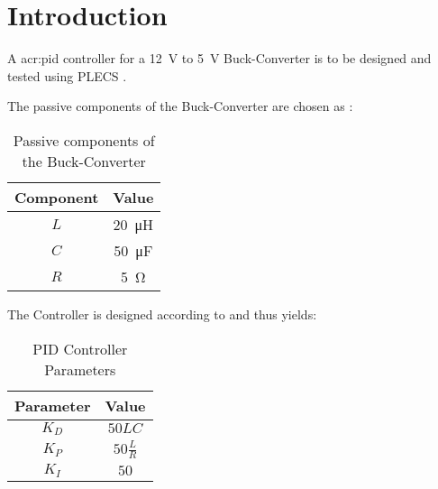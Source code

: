 \chapter{Introduction}
\label{chapter:introduction}

A \gls{acr:pid} controller for a \qty{12}{\volt} to \qty{5}{\volt} Buck-Converter is to be designed and tested using PLECS \autocite{PLECSPlexim}.

The passive components of the Buck-Converter are chosen as :

\begin{table}[htbp]
    \centering
    \begin{tabular}{c|c}
        Component & Value \\ \hline
        $L$ & \qty{20}{\micro\henry} \\ 
        $C$ & \qty{50}{\micro\farad} \\ 
        $R$ & \qty{5}{\ohm} \\ 
    \end{tabular}
    \caption{Passive components of the Buck-Converter}
    \label{tab:components}
\end{table}

The Controller is designed according to \autocite{samosirSimpleFormulaDesigning2023} and thus yields:

\begin{table}[htbp]
    \centering
    \begin{tabular}{c|c}
        Parameter & Value \\ \hline
        $K_D$ & $50 LC$ \\ 
        $K_P$ & $50 \frac{L}{R}$ \\ 
        $K_I$ & $50$ \\ 
    \end{tabular}
    \caption{PID Controller Parameters}
    \label{tab:pid_parameters}
\end{table}





